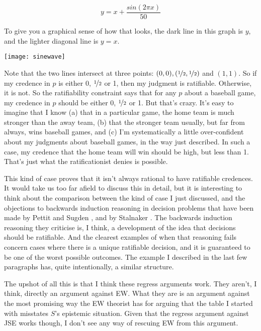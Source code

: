 \begin{equation}
y = x + \frac{sin(2\pi x)}{50}
\end{equation}

\noindent To give you a graphical sense of how that looks, the dark line in this graph is \(y\), and the lighter diagonal line is \(y = x\).

\begin{center}
\texttt{[image: sinewave]}
\end{center}

\noindent Note that the two lines intersect at three points: \((0, 0), (\nicefrac{1}{2}, \nicefrac{1}{2})\) and \((1, 1)\). So if my credence in \(p\) is either 0, \(\nicefrac{1}{2}\) or 1, then my judgment is ratifiable. Otherwise, it is not. So the ratifiability constraint says that for any \(p\) about a baseball game, my credence in \(p\) should be either 0, \(\nicefrac{1}{2}\) or 1. But that's crazy. It's easy to imagine that I know (a) that in a particular game, the home team is much stronger than the away team, (b) that the stronger team usually, but far from always, wins baseball games, and (c) I'm systematically a little over-confident about my judgments about baseball games, in the way just described. In such a case, my credence that the home team will win should be high, but less than 1. That's just what the ratificationist denies is possible.

This kind of case proves that it isn't always rational to have ratifiable credences. It would take us too far afield to discuss this in detail, but it is interesting to think about the comparison between the kind of case I just discussed, and the objections to backwards induction reasoning in decision problems that have been made by Pettit and Sugden \citeyearpar{Pettit1989-PETTBI}, and by Stalnaker \citeyearpar{Stalnaker1996, Stalnaker1998, Stalnaker1999}. The backwards induction reasoning they criticise is, I think, a development of the idea that decisions should be ratifiable. And the clearest examples of when that reasoning fails concern cases where there is a unique ratifiable decision, and it is guaranteed to be one of the worst possible outcomes. The example I described in the last few paragraphs has, quite intentionally, a similar structure.

The upshot of all this is that I think these regress arguments work. They aren't, I think, directly an argument against EW. What they are is an argument against the most promising way the EW theorist has for arguing that the table I started with misstates $S$'s epistemic situation. Given that the regress argument against JSE works though, I don't see any way of rescuing EW from this argument.
